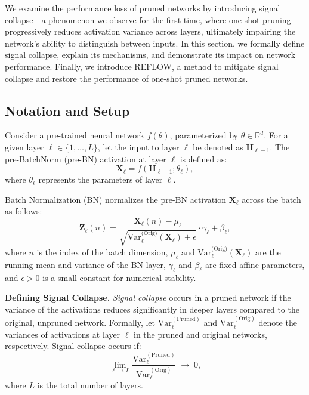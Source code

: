 We examine the performance loss of pruned networks by introducing signal collapse - a phenomenon we observe for the first time, where one-shot pruning progressively reduces activation variance across layers, ultimately impairing the network’s ability to distinguish between inputs. In this section, we formally define signal collapse, explain its mechanisms, and demonstrate its impact on network performance. Finally, we introduce REFLOW, a method to mitigate signal collapse and restore the performance of one-shot pruned networks.
\subsection{Notation and Setup}

Consider a pre-trained neural network \( f(\theta) \), parameterized by \(\theta \in \mathbb{R}^d\). For a given layer \(\ell \in \{1, \dots, L\}\), let the input to layer \(\ell\) be denoted as \(\mathbf{H}_{\ell-1}\). The pre-BatchNorm (pre-BN) activation at layer \(\ell\) is defined as:
\begin{equation}
    \mathbf{X}_\ell = f(\mathbf{H}_{\ell-1}; \theta_\ell),
    \label{eq:pre_bn_signal_formal}
\end{equation}
where \(\theta_\ell\) represents the parameters of layer \(\ell\).

Batch Normalization (BN) normalizes the pre-BN activation \(\mathbf{X}_\ell\) across the batch as follows:
\begin{equation}
    \mathbf{Z}_\ell(n) = 
    \frac{\mathbf{X}_\ell(n) - \mu_\ell}
    {\sqrt{\mathrm{Var}_\ell^{\text{(Orig)}}(\mathbf{X}_\ell) + \epsilon}} \cdot \gamma_\ell + \beta_\ell,
    \label{eq:bn_transform}
\end{equation}
where \(n\) is the index of the batch dimension, \(\mu_\ell\) and \(\mathrm{Var}_\ell^{\text{(Orig)}}(\mathbf{X}_\ell)\) are the running mean and variance of the BN layer, \(\gamma_\ell\) and \(\beta_\ell\) are fixed affine parameters, and \(\epsilon > 0\) is a small constant for numerical stability.


\noindent \textbf{Defining Signal Collapse.}
\emph{Signal collapse} occurs in a pruned network if the variance of the activations reduces significantly in deeper layers compared to the original, unpruned network. Formally, let \(\mathrm{Var}_\ell^{(\text{Pruned})}\) and \(\mathrm{Var}_\ell^{(\text{Orig})}\) denote the variances of activations at layer \(\ell\) in the pruned and original networks, respectively. Signal collapse occurs if:
\begin{equation}
    \lim_{\ell \to L} 
    \frac{\mathrm{Var}_\ell^{(\text{Pruned})}}{\mathrm{Var}_\ell^{(\text{Orig})}}
    \;\to\; 0,
    \label{eq:signal_collapse_definition}
\end{equation}
where \(L\) is the total number of layers.

